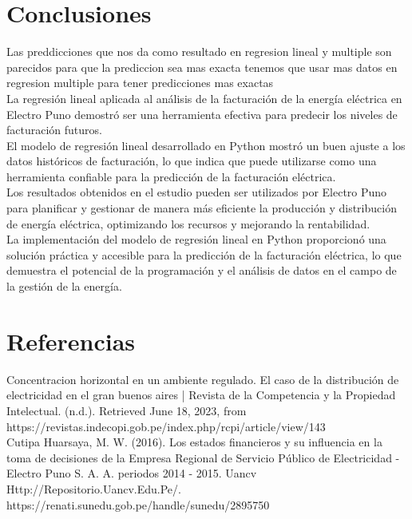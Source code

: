 \documentclass{article}
\begin{document}
\section{Conclusiones}
Las preddicciones que nos da como resultado en regresion lineal y multiple son parecidos para que la prediccion sea mas exacta tenemos que usar mas datos en regresion multiple para tener predicciones mas exactas
\\

La regresión lineal aplicada al análisis de la facturación de la energía eléctrica en Electro Puno demostró ser una herramienta efectiva para predecir los niveles de facturación futuros.
\\

El modelo de regresión lineal desarrollado en Python mostró un buen ajuste a los datos históricos de facturación, lo que indica que puede utilizarse como una herramienta confiable para la predicción de la facturación eléctrica.
\\

Los resultados obtenidos en el estudio pueden ser utilizados por Electro Puno para planificar y gestionar de manera más eficiente la producción y distribución de energía eléctrica, optimizando los recursos y mejorando la rentabilidad.
\\

La implementación del modelo de regresión lineal en Python proporcionó una solución práctica y accesible para la predicción de la facturación eléctrica, lo que demuestra el potencial de la programación y el análisis de datos en el campo de la gestión de la energía.
\section{Referencias}


Concentracion horizontal en un ambiente regulado. El caso de la distribución de electricidad en el gran buenos aires | Revista de la Competencia y la Propiedad Intelectual. (n.d.). Retrieved June 18, 2023, from https://revistas.indecopi.gob.pe/index.php/rcpi/article/view/143 
\\

Cutipa Huarsaya, M. W. (2016). Los estados financieros y su influencia en la toma de decisiones de la Empresa Regional de Servicio Público de Electricidad - Electro Puno S. A. A. periodos 2014 - 2015. Uancv Http://Repositorio.Uancv.Edu.Pe/. https://renati.sunedu.gob.pe/handle/sunedu/2895750 
\\
\end{document}

